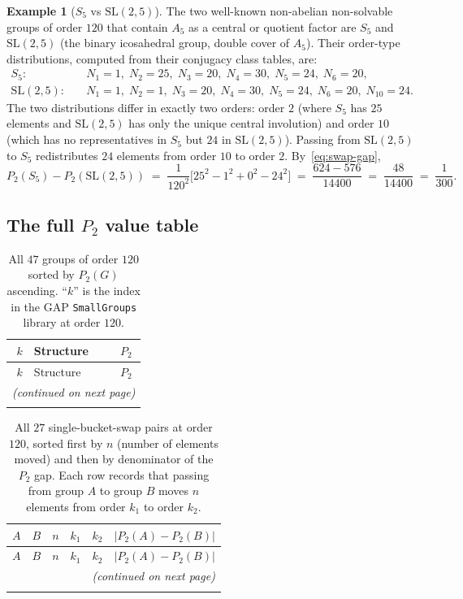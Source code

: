 \documentclass[11pt]{amsart}
\theoremstyle{plain}
\theoremstyle{definition}
\newtheorem{example}[theorem]{Example}
\begin{document}
\begin{example}[$S_5$ vs $\mathrm{SL}(2,5)$]
\label{ex:s5-sl25}
The two well-known non-abelian non-solvable groups of order $120$ that contain $A_5$ as a central or quotient factor are $S_5$ and $\mathrm{SL}(2,5)$ (the binary icosahedral group, double cover of $A_5$). Their order-type distributions, computed from their conjugacy class tables, are:
\[
\begin{aligned}
S_5:        \quad & N_1 = 1,\; N_2 = 25,\; N_3 = 20,\; N_4 = 30,\; N_5 = 24,\; N_6 = 20, \\
\mathrm{SL}(2,5): \quad & N_1 = 1,\; N_2 = 1,\; N_3 = 20,\; N_4 = 30,\; N_5 = 24,\; N_6 = 20,\; N_{10} = 24.
\end{aligned}
\]
The two distributions differ in exactly two orders: order $2$ (where $S_5$ has $25$ elements and $\mathrm{SL}(2,5)$ has only the unique central involution) and order $10$ (which has no representatives in $S_5$ but $24$ in $\mathrm{SL}(2,5)$). Passing from $\mathrm{SL}(2,5)$ to $S_5$ redistributes $24$ elements from order $10$ to order $2$. By~\eqref{eq:swap-gap},
\[
  P_2(S_5) - P_2(\mathrm{SL}(2,5)) \;=\; \frac{1}{120^2}\Big[25^2 - 1^2 + 0^2 - 24^2\Big] \;=\; \frac{624 - 576}{14400} \;=\; \frac{48}{14400} \;=\; \frac{1}{300}.
\]
\end{example}

\subsection{The full $P_2$ value table}

\begin{longtable}{rlr@{$\,/\,$}l}
\caption{All $47$ groups of order $120$ sorted by $P_2(G)$ ascending. ``$k$'' is the index in the GAP \texttt{SmallGroups} library at order $120$.}\label{tab:p2-values}\\
\toprule
$k$ & Structure & \multicolumn{2}{c}{$P_2$} \\
\midrule
\endfirsthead
\toprule
$k$ & Structure & \multicolumn{2}{c}{$P_2$} \\
\midrule
\endhead
\midrule
\multicolumn{4}{r}{\textit{(continued on next page)}}\\
\endfoot
\bottomrule
\endlastfoot

\end{longtable}

\begin{longtable}{rrrrrr@{$\,/\,$}l}
\caption{All $27$ single-bucket-swap pairs at order $120$, sorted first by $n$ (number of elements moved) and then by denominator of the $P_2$ gap. Each row records that passing from group $A$ to group $B$ moves $n$ elements from order $k_1$ to order $k_2$.}\label{tab:swap-pairs}\\
\toprule
$A$ & $B$ & $n$ & $k_1$ & $k_2$ & \multicolumn{2}{c}{$|P_2(A) - P_2(B)|$} \\
\midrule
\endfirsthead
\toprule
$A$ & $B$ & $n$ & $k_1$ & $k_2$ & \multicolumn{2}{c}{$|P_2(A) - P_2(B)|$} \\
\midrule
\endhead
\midrule
\multicolumn{7}{r}{\textit{(continued on next page)}}\\
\endfoot
\bottomrule
\endlastfoot

\end{longtable}
\end{document}
